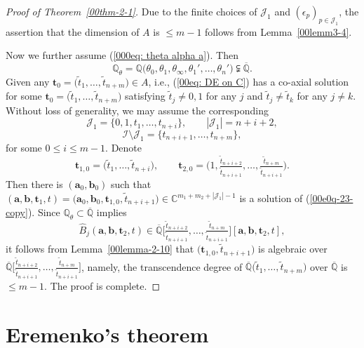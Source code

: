 \documentclass[10pt,a4paper]{amsart}
\numberwithin{equation}{section}
\def\C{\mathbb C}
\def\Q{\mathbb Q}
\begin{document}
\begin{proof}[Proof of Theorem~\ref{00thm-2-1}] Due to the finite choices of $\mathcal{J}_1$ and $(\epsilon_p)_{p\in\mathcal{J}_1}$, the assertion that the dimension of $A$ is $\leq m-1$ follows from Lemma~\ref{00lemm3-4}.

Now we further assume (\ref{000eq: theta alpha a}). Then
\[
 \Q_{\theta}=\Q\bigl(\theta_0,\theta_1,\theta_\infty,\theta_1',
 \dots,\theta_n'\bigr)\subsetneqq \overline{\Q}.
\]
Given any $\boldsymbol t_0=\bigl(\tilde{t}_{1},\dots, \tilde{t}_{n+m}\bigr)
\in A$, i.e., (\ref{00eq: DE on C}) has a co-axial solution for some
$\boldsymbol t_0=\bigl(\tilde{t}_{1},\dots, \tilde{t}_{n+m}\bigr)$ satisfying
$\tilde{t}_{j}\neq 0,1$ for any $j$ and $\tilde{t}_{j}\neq
\tilde{t}_{k}$ for any $j\neq k$. Without loss of generality, we may
assume the corresponding
\[
 \mathcal{J}_1=\{0,1,t_1,\dots, t_{n+i}\},\qquad
 |\mathcal{J}_1|=n+i+2,
\]
\[
 \mathcal{I}\setminus \mathcal{J}_1=\{t_{n+i+1},\dots,t_{n+m}\},
\]
for some $0\leq i\leq m-1$. Denote
\[
 \boldsymbol t_{1,0}=\bigl(\tilde{t}_1,\dots,\tilde{t}_{n+i}\bigr),
 \qquad \boldsymbol
t_{2,0}=\Big(1,\tfrac{\tilde{t}_{n+i+2}}{\tilde{t}_{n+i+1}},\dots,
\tfrac{\tilde{t}_{n+m}}{\tilde{t}_{n+i+1}}\Big).
\]
Then there is $(\boldsymbol a_0, \boldsymbol b_0)$ such that
$(\boldsymbol a, \boldsymbol b, \boldsymbol t_1, t)=\bigl(\boldsymbol a_0,
\boldsymbol b_0, \boldsymbol t_{1,0}, \tilde{t}_{n+i+1}\bigr)\in
\C^{m_1+m_2+|\mathcal{J}_1|-1}$ is a solution of
(\ref{00e0q-23-copy}). Since $\Q_{\theta}\subset\overline{\Q}$
implies
\[
 \widehat{B}_j(\boldsymbol a, \boldsymbol b,\boldsymbol t_2, t)
 \in\overline{\Q}\Big[\tfrac{\tilde{t}_{n+i+2}}{\tilde{t}_{n+i+1}},
 \dots, \tfrac{\tilde{t}_{n+m}}{\tilde{t}_{n+i+1}}\Big][\boldsymbol a,
 \boldsymbol b,\boldsymbol t_2,t],
\]
it follows from Lemma~\ref{00lemma-2-10} that $\bigl(\boldsymbol t_{1,0},
\tilde{t}_{n+i+1}\bigr)$ is algebraic over
$\overline{\Q}\Big[\tfrac{\tilde{t}_{n+i+2}}{\tilde{t}_{n+i+1}},\dots,
\tfrac{\tilde{t}_{n+m}}{\tilde{t}_{n+i+1}}\Big]$, namely, the
transcendence degree of $\overline{\Q}\bigl(\tilde{t}_{1},\dots,
\tilde{t}_{n+m}\bigr)$ over $\overline{\Q}$ is $\leq m-1$. The proof is
complete.
\end{proof}


\section{Eremenko's theorem}
\label{sec-Eremenko}
\end{document}
